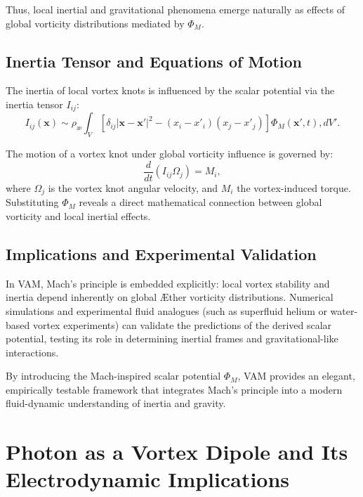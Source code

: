 \documentclass[a4paper,12pt]{article}
\begin{document}
Thus, local inertial and gravitational phenomena emerge naturally as effects of global vorticity distributions mediated by $\Phi_M$.


\subsection{Inertia Tensor and Equations of Motion}
The inertia of local vortex knots is influenced by the scalar potential via the inertia tensor $I_{ij}$:
\begin{equation}
    I_{ij}(\mathbf{x}) \sim \rho_\text{\ae}\int_V \left[\delta_{ij}|\mathbf{x}-\mathbf{x}'|^2 - (x_i - x'_i)(x_j - x'_j)\right]\Phi_M(\mathbf{x}',t), dV'.
\end{equation}


The motion of a vortex knot under global vorticity influence is governed by:
\begin{equation}
    \frac{d}{dt}(I_{ij}\Omega_j) = M_i,
\end{equation}
where $\Omega_j$ is the vortex knot angular velocity, and $M_i$ the vortex-induced torque. Substituting $\Phi_M$ reveals a direct mathematical connection between global vorticity and local inertial effects.


\subsection{Implications and Experimental Validation}
In VAM, Mach's principle is embedded explicitly: local vortex stability and inertia depend inherently on global Æther vorticity distributions. Numerical simulations and experimental fluid analogues (such as superfluid helium or water-based vortex experiments) can validate the predictions of the derived scalar potential, testing its role in determining inertial frames and gravitational-like interactions.


By introducing the Mach-inspired scalar potential $\Phi_M$, VAM provides an elegant, empirically testable framework that integrates Mach's principle into a modern fluid-dynamic understanding of inertia and gravity.


\section{Photon as a Vortex Dipole and Its Electrodynamic Implications}
\end{document}
